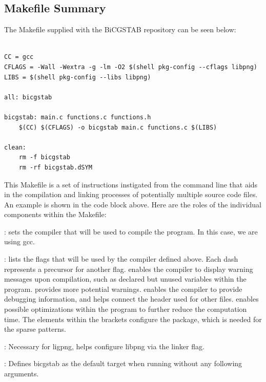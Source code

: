 \documentclass[12pt]{article}
\begin{document}
	\subsection{Makefile Summary}
	
	The Makefile supplied with the BiCGSTAB repository can be seen below:

 	\begin{mdframed}[style=myboxstyleTerminal1]
		\begin{verbatim}
  
CC = gcc
CFLAGS = -Wall -Wextra -g -lm -O2 $(shell pkg-config --cflags libpng)
LIBS = $(shell pkg-config --libs libpng)

all: bicgstab

bicgstab: main.c functions.c functions.h
	$(CC) $(CFLAGS) -o bicgstab main.c functions.c $(LIBS)

clean:
	rm -f bicgstab
	rm -rf bicgstab.dSYM
		\end{verbatim}
	\end{mdframed}

This Makefile is a set of instructions instigated from the command line that aids in the compilation and linking processes of potentially multiple source code files. An example is shown in the code block above. Here are the roles of the individual components within the Makefile:

:  sets the compiler that will be used to compile the program. In this case, we are using gcc.

:  lists the flags that will be used by the compiler defined above. Each dash represents a precursor for another flag.  enables the compiler to display warning messages upon compilation, such as declared but unused variables within the program.  provides more potential warnings.  enables the compiler to provide debugging information, and  helps connect the  header used for other files.  enables possible optimizations within the program to further reduce the computation time. The elements within the brackets configure the  package, which is needed for the sparse patterns.

: Necessary for ligpng, helps configure libpng via the linker flag.

: Defines bicgstab as the default target when running  without any following arguments.
\end{document}
